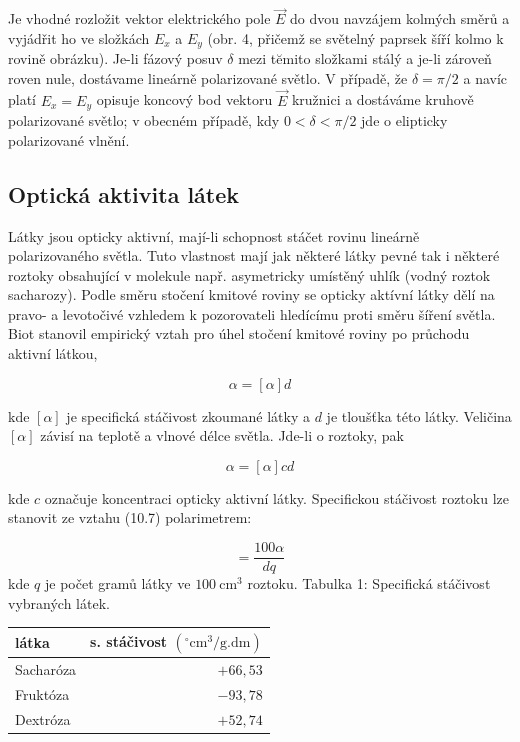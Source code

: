 \documentclass[czech,11pt,a4paper]{article}
\begin{document}
\begin{multicols}{2}
	Je vhodné rozložit vektor elektrického pole $\vec{E}$ do dvou navzájem kolmých směrů a vyjádřit ho ve složkách $E_{x}$ a $E_{y}$ (obr. 4, přičemž se světelný paprsek šíří kolmo k rovině obrázku). Je-li fázový posuv $\delta$ mezi tĕmito složkami stálý a je-li zároveň roven nule, dostávame lineárně polarizované světlo. V případě, že $\delta=\pi / 2$ a navíc platí $E_{x}=E_{y}$ opisuje koncový bod vektoru $\vec{E}$ kružnici a dostáváme kruhově polarizované světlo; v obecném případě, kdy $0<\delta<\pi / 2$ jde o elipticky polarizované vlnění.
	
	\subsection*{Optická aktivita látek}
	Látky jsou opticky aktivní, mají-li schopnost stáčet rovinu lineárně polarizovaného světla. Tuto vlastnost mají jak některé látky pevné tak i některé roztoky obsahující v molekule např. asymetricky umístěný uhlík (vodný roztok sacharozy). Podle směru stočení kmitové roviny se opticky aktívní látky dělí na pravo- a levotočivé vzhledem k pozorovateli hledícímu proti směru šíření světla. Biot stanovil empirický vztah pro úhel stočení kmitové roviny po průchodu aktivní látkou,
	
	
	\begin{equation}
		\alpha=[\alpha] d
	\end{equation}
	
	
	kde $[\alpha]$ je specifická stáčivost zkoumané látky a $d$ je tloušťka této látky. Veličina $[\alpha]$ závisí na teplotě a vlnové délce světla. Jde-li o roztoky, pak
	
	\begin{equation}
		\alpha=[\alpha] c d
	\end{equation}
	
	
	kde $c$ označuje koncentraci opticky aktivní látky. Specifickou stáčivost roztoku lze stanovit ze vztahu (10.7) polarimetrem:
	
	
	\begin{equation}
		[\alpha]=\frac{100 \alpha}{d q}
	\end{equation}
	kde $q$ je počet gramů látky ve $100 \mathrm{~cm}^{3}$ roztoku.
	Tabulka 1: Specifická stáčivost vybraných látek.
	
	\begin{center}
		\begin{tabular}{|l|r|}
			\hline
			látka & s. stáčivost $\left({ }^{\circ} \mathrm{cm}^{3} / \mathrm{g} . \mathrm{dm}\right)$ \\
			\hline
			Sacharóza & $+66,53$ \\
			Fruktóza & $-93,78$ \\
			Dextróza & $+52,74$ \\
			\hline
		\end{tabular}
	\end{center}
	

\end{multicols}
\end{document}
